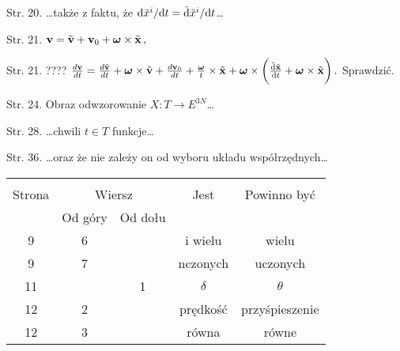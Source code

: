 \documentclass[a4paper,11pt]{article}
\begin{document}
Str. 20. \ldots także z faktu, że
$\mathrm{d} \tilde{ x }^{ i } / \mathrm{d} t = \tilde{ \mathrm{d} } \tilde{ x
}^{ i } / \mathrm{d} t$\ldots

Str. 21.
$\mathbf{v} = \tilde{ \mathbf{v} } + \mathbf{v}_{ 0 } +
\boldsymbol{\omega} \times \tilde{ \mathbf{x} } \, ,$

Str. 21. ????
$\frac{ d\mathbf{v} }{ dt } = \frac{ d\tilde{ \mathbf{v} } }{ dt }
+ \boldsymbol{\omega} \times \tilde{ \mathbf{v} } + \frac{
  d\mathbf{v}_{ 0 } }{ dt } + \frac{ \boldsymbol{\omega} }{ t }
\times \tilde{ \mathbf{x} } + \boldsymbol{\omega}  \times \bigg(
\frac{ \tilde{ \mathrm{d} } \tilde{ \mathbf{x} } }{ \mathrm{d} t } +
\boldsymbol{\omega} \times \tilde{ \mathbf{x} } \bigg) \, .$
Sprawdzić.

Str. 24. Obraz odwzorowanie
$X : T \rightarrow E^{ 3N }$\ldots

Str. 28. \ldots chwili $t \in T$ funkcje\ldots

Str. 36. \ldots oraz że nie zależy on od wyboru układu
współrzędnych\ldots


\vspace{\spaceTwo}














\begin{center}

  \begin{tabular}{|c|c|c|c|c|}
    \hline
    & \multicolumn{2}{c|}{} & & \\
    Strona & \multicolumn{2}{c|}{Wiersz}
                            & Jest & Powinno być \\ \cline{2-3}
    & Od góry & Od dołu & & \\
    \hline
    9   &  6 & & i wielu & wielu \\
    9   &  7 & & nczonych & uczonych \\
    11  & &  1 & $\delta$ & $\theta$ \\
    12  &  2 & & prędkość & przyśpieszenie \\
    12  &  3 & & równa & równe \\
    \hline
  \end{tabular}

\end{center}
\end{document}
